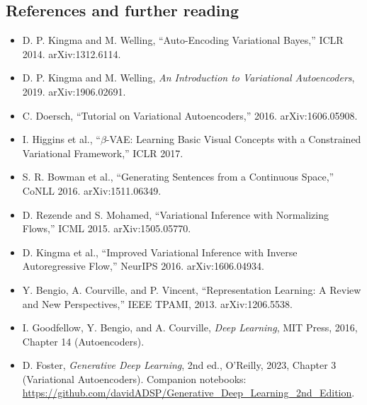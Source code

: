 \documentclass[11pt]{article}
\theoremstyle{remark}
\begin{document}
\subsection*{References and further reading}
\begin{itemize}[leftmargin=1.2em]
  \item D. P. Kingma and M. Welling, ``Auto-Encoding Variational Bayes,'' ICLR 2014. arXiv:1312.6114.
  \item D. P. Kingma and M. Welling, \emph{An Introduction to Variational Autoencoders}, 2019. arXiv:1906.02691.
  \item C. Doersch, ``Tutorial on Variational Autoencoders,'' 2016. arXiv:1606.05908.
  \item I. Higgins et al., ``$\beta$-VAE: Learning Basic Visual Concepts with a Constrained Variational Framework,'' ICLR 2017.
  \item S. R. Bowman et al., ``Generating Sentences from a Continuous Space,'' CoNLL 2016. arXiv:1511.06349.
  \item D. Rezende and S. Mohamed, ``Variational Inference with Normalizing Flows,'' ICML 2015. arXiv:1505.05770.
  \item D. Kingma et al., ``Improved Variational Inference with Inverse Autoregressive Flow,'' NeurIPS 2016. arXiv:1606.04934.
  \item Y. Bengio, A. Courville, and P. Vincent, ``Representation Learning: A Review and New Perspectives,'' IEEE TPAMI, 2013. arXiv:1206.5538.
  \item I. Goodfellow, Y. Bengio, and A. Courville, \emph{Deep Learning}, MIT Press, 2016, Chapter 14 (Autoencoders).
  \item D. Foster, \emph{Generative Deep Learning}, 2nd ed., O'Reilly, 2023, Chapter 3 (Variational Autoencoders). Companion notebooks: \url{https://github.com/davidADSP/Generative_Deep_Learning_2nd_Edition}.
\end{itemize}
\end{document}
